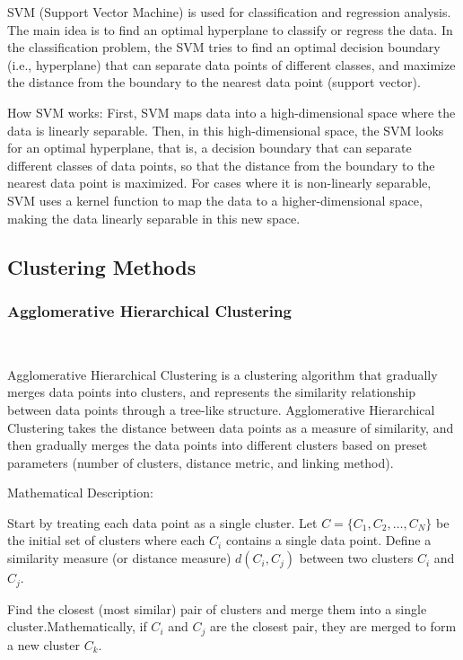 \documentclass[conference]{IEEEtran}
\begin{document}
	SVM (Support Vector Machine) is used for classification and regression analysis. The main idea is to find an optimal hyperplane to classify or regress the data. In the classification problem, the SVM tries to find an optimal decision boundary (i.e., hyperplane) that can separate data points of different classes, and maximize the distance from the boundary to the nearest data point (support vector).
	
	How SVM works: First, SVM maps data into a high-dimensional space where the data is linearly separable. Then, in this high-dimensional space, the SVM looks for an optimal hyperplane, that is, a decision boundary that can separate different classes of data points, so that the distance from the boundary to the nearest data point is maximized. For cases where it is non-linearly separable, SVM uses a kernel function to map the data to a higher-dimensional space, making the data linearly separable in this new space.
	
	\subsection{Clustering Methods}
	\subsubsection{Agglomerative Hierarchical Clustering} \
	
	Agglomerative Hierarchical Clustering is a clustering algorithm that gradually merges data points into clusters, and represents the similarity relationship between data points through a tree-like structure. Agglomerative Hierarchical Clustering takes the distance between data points as a measure of similarity, and then gradually merges the data points into different clusters based on preset parameters (number of clusters, distance metric, and linking method).
	
	Mathematical Description:
	
	Start by treating each data point as a single cluster. Let $C = \{C_1, C_2, \ldots, C_N\}$ be the initial set of clusters where each $C_i$ contains a single data point. Define a similarity measure (or distance measure) $d(C_i, C_j)$ between two clusters $C_i$ and $C_j$.
	
	Find the closest (most similar) pair of clusters and merge them into a single cluster.Mathematically, if $C_i$ and $C_j$ are the closest pair, they are merged to form a new cluster $C_k$.
	
\end{document}
